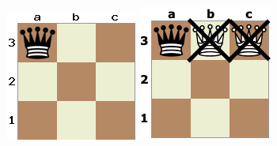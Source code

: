 \documentclass[12pt]{article}
\begin{document}
\begin{figure}[h]
    \centering
    \begin{minipage}{0.3\textwidth}
        \centering
        \includegraphics[width=\textwidth]{Fig5.png}
    \end{minipage}
    \hspace{0.03\textwidth}
    \begin{minipage}{0.3\textwidth}
        \centering
        \includegraphics[width=\textwidth]{Fig6.png}

\end{minipage}
\end{figure}
\end{document}
